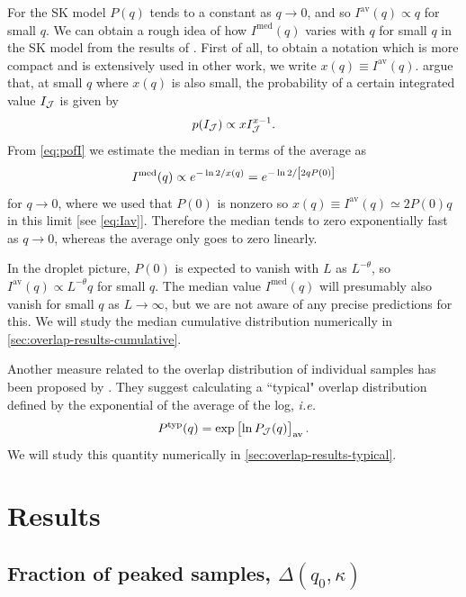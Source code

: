 For the SK model $P(q)$ tends to a constant as $q \to 0$, and so
$I^{\mathrm{av}}(q) \propto q$ for small $q$. We can obtain a rough idea of how
$I^{\mathrm{med}}(q)$ varies with $q$ for small $q$ in the SK model from the
results of \textcite{mezard1984nature}. First of all, to obtain a notation
which is more compact and is extensively used in other work, we write $x(q)
\equiv I^{\mathrm{av}}(q)$. \textcite{mezard1984nature} argue that, at small
$q$ where $x(q)$ is also small, the probability of a certain integrated value
$I_{\mathcal{J}}$ is given by
\begin{equation}
  p(I_{\mathcal{J}}) \propto x I_{\mathcal{J}}^{x-1}.
  \label{eq:pofI}
\end{equation}
From \cref{eq:pofI} we estimate the median in terms of the average as
\begin{equation}
  I^{\mathrm{med}}(q) \propto e^{-\ln 2 / x(q)} = e^{-\ln 2/\left[2 q P(0)\right]}
  \label{eq:median-small-q}
\end{equation}
for $q \to 0$, where we used that $P(0)$ is nonzero so $x(q) \equiv
I^{\mathrm{av}}(q) \simeq 2 P(0) q$ in this limit [see \cref{eq:Iav}].
Therefore the median tends to zero exponentially fast as $q \to 0$, whereas the
average only goes to zero linearly.

In the droplet picture, $P(0)$ is expected to vanish with $L$ as $L^{-\theta}$,
so $I^{\mathrm{av}}(q) \propto L^{-\theta} q$ for small $q$.
The median value $I^{\mathrm{med}}(q)$ will presumably also vanish for small $q$
as $L \to \infty$, but we are not aware of any precise predictions for this.
We will study the median cumulative distribution numerically in
\cref{sec:overlap-results-cumulative}.

Another measure related to the overlap distribution of individual samples has
been proposed by \textcite{monthus2013typical}. They suggest calculating a
``typical" overlap distribution defined by the exponential of the average of
the log, \emph{i.e.}
\begin{equation}
  P^{\mathrm{typ}}(q) = \exp\left[\ln P_{\mathcal{J}}(q)\right]_{\mathrm{av}}.
  \label{eq:pofq-typical}
\end{equation}
We will study this quantity numerically in \cref{sec:overlap-results-typical}.


\section{Results}

\subsection{Fraction of peaked samples, $\Delta(q_0,\kappa)$}
\label{sec:overlap-results-delta}

